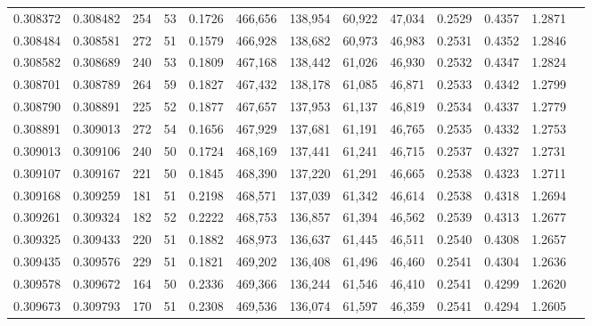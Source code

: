 \begin{tabular}{rrrrrrrrrrrrr}
0.308372 & 0.308482 &   254 &  53 &                                     0.1726 & 466,656 & 138,954 &  60,922 &  47,034 & 0.2529 & 0.4357 & 1.2871 \\
0.308484 & 0.308581 &   272 &  51 &                                     0.1579 & 466,928 & 138,682 &  60,973 &  46,983 & 0.2531 & 0.4352 & 1.2846 \\
0.308582 & 0.308689 &   240 &  53 &                                     0.1809 & 467,168 & 138,442 &  61,026 &  46,930 & 0.2532 & 0.4347 & 1.2824 \\
0.308701 & 0.308789 &   264 &  59 &                                     0.1827 & 467,432 & 138,178 &  61,085 &  46,871 & 0.2533 & 0.4342 & 1.2799 \\
0.308790 & 0.308891 &   225 &  52 &                                     0.1877 & 467,657 & 137,953 &  61,137 &  46,819 & 0.2534 & 0.4337 & 1.2779 \\
0.308891 & 0.309013 &   272 &  54 &                                     0.1656 & 467,929 & 137,681 &  61,191 &  46,765 & 0.2535 & 0.4332 & 1.2753 \\
0.309013 & 0.309106 &   240 &  50 &                                     0.1724 & 468,169 & 137,441 &  61,241 &  46,715 & 0.2537 & 0.4327 & 1.2731 \\
0.309107 & 0.309167 &   221 &  50 &                                     0.1845 & 468,390 & 137,220 &  61,291 &  46,665 & 0.2538 & 0.4323 & 1.2711 \\
0.309168 & 0.309259 &   181 &  51 &                                     0.2198 & 468,571 & 137,039 &  61,342 &  46,614 & 0.2538 & 0.4318 & 1.2694 \\
0.309261 & 0.309324 &   182 &  52 &                                     0.2222 & 468,753 & 136,857 &  61,394 &  46,562 & 0.2539 & 0.4313 & 1.2677 \\
0.309325 & 0.309433 &   220 &  51 &                                     0.1882 & 468,973 & 136,637 &  61,445 &  46,511 & 0.2540 & 0.4308 & 1.2657 \\
0.309435 & 0.309576 &   229 &  51 &                                     0.1821 & 469,202 & 136,408 &  61,496 &  46,460 & 0.2541 & 0.4304 & 1.2636 \\
0.309578 & 0.309672 &   164 &  50 &                                     0.2336 & 469,366 & 136,244 &  61,546 &  46,410 & 0.2541 & 0.4299 & 1.2620 \\
0.309673 & 0.309793 &   170 &  51 &                                     0.2308 & 469,536 & 136,074 &  61,597 &  46,359 & 0.2541 & 0.4294 & 1.2605 \\

\end{tabular}
